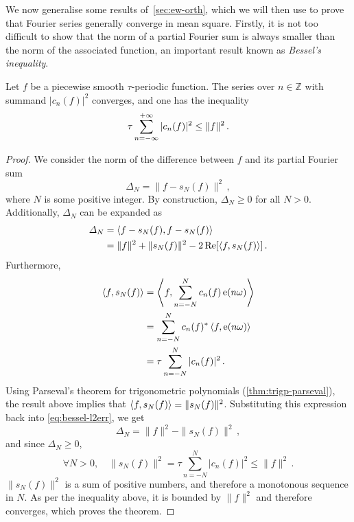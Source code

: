 We now generalise some results of~\cref{sec:ew-orth}, which we will then use to prove that Fourier series generally converge in mean square. Firstly, it is not too difficult to
show that the norm of a partial Fourier sum is always smaller than the norm of the associated function,
an important result known as \emph{Bessel's inequality}.
\begin{theorem}
  \label{thm:bessel}
  Let $f$ be a piecewise smooth $\tau$-periodic function. The series over $n\in\mathbb{Z}$
  with summand $|c_n(f)|^2$ converges, and one has the inequality
  \begin{equation}
    \tau\sum_{n=-\infty}^{+\infty}|c_n(f)|^2\leq\|f\|^2\,.
  \end{equation}
\end{theorem}
\begin{proof}
  We consider the norm of the difference between $f$ and its partial Fourier sum
  \begin{equation}
    \Delta_N=\|f-s_N(f)\|^2\,,
  \end{equation}
  where $N$ is some positive integer. By construction, $\Delta_N\geq 0$ for all $N>0$.
  Additionally, $\Delta_N$ can be expanded as
  \begin{align}
    \Delta_N&=\braket{f-s_N(f),f-s_N(f)}\\
    &=\|f\|^2+\|s_N(f)\|^2-2\operatorname{Re}[\braket{f,s_N(f)}]\,.\label{eq:bessel-l2err}
  \end{align}
  Furthermore,
  \begin{align}
    \braket{f,s_N(f)}&=\Braket{f,\sum_{n=-N}^{N}c_n(f)\operatorname{e}(n\omega)}\\
    &=\sum_{n=-N}^{N}c_n(f)^*\braket{f,\operatorname{e}(n\omega)}\\
    &=\tau\sum_{n=-N}^{N}|c_n(f)|^2\,.
  \end{align}
  Using Parseval's theorem for trigonometric polynomials (\cref{thm:trigp-parseval}), the result
  above implies that $\braket{f,s_N(f)}=\|s_N(f)\|^2$. Substituting this expression back into
  \cref{eq:bessel-l2err}, we get
  \begin{equation}
    \Delta_N=\|f\|^2-\|s_N(f)\|^2\,,
  \end{equation}
  and since $\Delta_N\geq 0$,
  \begin{equation}
    \forall N>0,\quad \|s_N(f)\|^2=\tau\sum_{n=-N}^{N}|c_n(f)|^2\leq \|f\|^2\,.
  \end{equation}
  $\|s_N(f)\|^2$ is a sum of positive numbers, and therefore a monotonous sequence in $N$. As per the inequality above, it is bounded by $\|f\|^2$ and therefore converges, which proves the theorem.
\end{proof}
